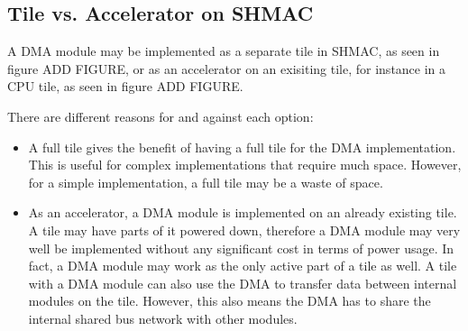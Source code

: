 %

\subsection{Tile vs. Accelerator on SHMAC}

A DMA module may be implemented as a separate tile in SHMAC, as seen in figure  ADD FIGURE, or as an accelerator on an exisiting tile, for instance in a CPU tile, as seen in figure  ADD FIGURE.

There are different reasons for and against each option:
\begin{itemize}
    \item A full tile gives the benefit of having a full tile for the DMA implementation.
    This is useful for complex implementations that require much space.
    However, for a simple implementation, a full tile may be a waste of space.
    \item As an accelerator, a DMA module is implemented on an already existing tile.
    A tile may have parts of it powered down, therefore a DMA module may very well be implemented without any significant cost in terms of power usage.
    In fact, a DMA module may work as the only active part of a tile as well.
    A tile with a DMA module can also use the DMA to transfer data between internal modules on the tile.
    However, this also means the DMA has to share the internal shared bus network with other modules.
\end{itemize}

